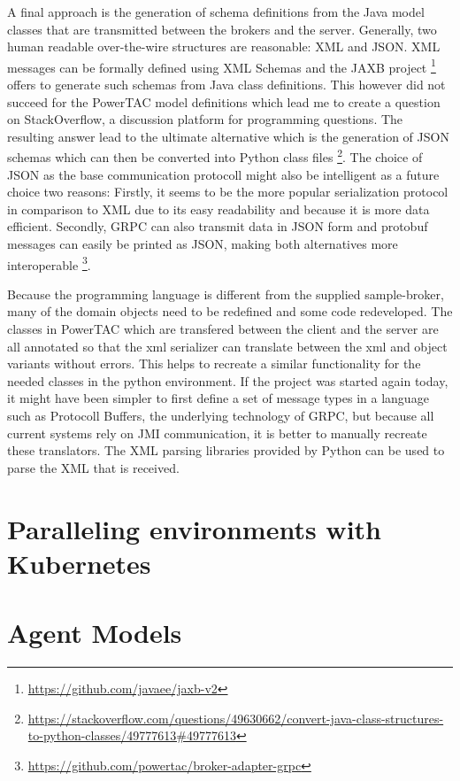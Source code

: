 A final approach is the generation of schema definitions from the Java model classes that are transmitted between the brokers and the server. Generally, two human readable over-the-wire structures are reasonable: \ac {XML} and \ac{JSON}. \ac {XML} messages can be formally defined using \ac {XML} Schemas and the \ac{JAXB} project
\footnote{\url{https://github.com/javaee/jaxb-v2}}
offers to generate such schemas from Java class definitions. This however did not succeed for the \ac {PowerTAC} model definitions which lead me to create a question on StackOverflow, a discussion platform for programming questions. The resulting answer lead to the ultimate alternative which is the generation of \ac {JSON} schemas which can then be converted into Python class files  
\footnote{\url{https://stackoverflow.com/questions/49630662/convert-java-class-structures-to-python-classes/49777613\#49777613}}.
The choice of \ac {JSON} as the base communication protocoll might also be intelligent as a future choice two reasons: Firstly, it seems to be the more popular serialization protocol in comparison to \ac {XML} \citep{jsonxml} due to its easy readability and because it is more data efficient. Secondly, \ac {GRPC} can also transmit data in \ac {JSON} form and protobuf messages can easily be printed as \ac {JSON}, making both alternatives more interoperable
\footnote{\url{https://github.com/powertac/broker-adapter-grpc} }.

Because the programming language is different from the supplied sample-broker, many of the domain objects need to be redefined and some code redeveloped. The classes in \ac {PowerTAC} which are transfered between the client and the server are all annotated so that the xml serializer can translate between the xml and object variants without errors. This helps to recreate a similar functionality for the needed classes in the python environment. If the project was started again today, it might have been simpler to first define a set of message types in a language such as Protocoll Buffers, the underlying technology of \ac {GRPC}, but because all current systems rely on \ac {JMI} communication, it is better to manually recreate these translators. The \ac {XML} parsing libraries provided by Python can be used to parse the \ac {XML} that is received.
\section{Paralleling environments with Kubernetes}

\section{Agent Models}

